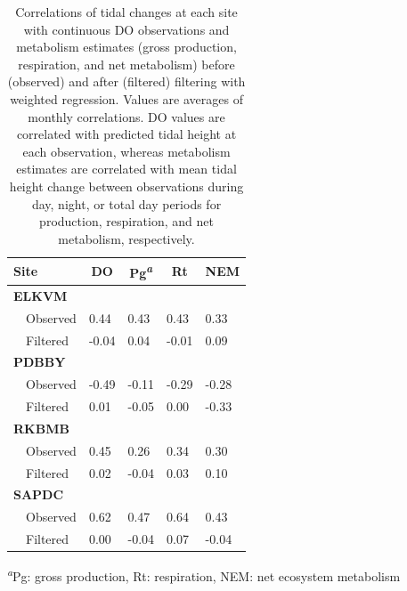 \documentclass[letterpaper,12pt,oneside]{article}\usepackage[]{graphicx}\usepackage[]{color}
\begin{document}
\begin{table}[!tbp]
\caption{Correlations of tidal changes at each site with continuous \ac{DO} observations and metabolism estimates (gross production, respiration, and net metabolism) before (observed) and after (filtered) filtering with weighted regression.  Values are averages of monthly correlations.  \ac{DO} values are correlated with predicted tidal height at each observation, whereas metabolism estimates are correlated with mean tidal height change between observations during day, night, or total day periods for production, respiration, and net metabolism, respectively.\label{tab:cor_res}} 
\begin{center}
\begin{tabular}{lllll}
\hline\hline
\multicolumn{1}{l}{Site}&\multicolumn{1}{c}{DO}&\multicolumn{1}{c}{Pg\textsuperscript{\textit{a}}}&\multicolumn{1}{c}{Rt}&\multicolumn{1}{c}{NEM}\tabularnewline
\hline
{\bfseries ELKVM}&&&&\tabularnewline
~~Observed& 0.44& 0.43& 0.43& 0.33\tabularnewline
~~Filtered&-0.04& 0.04&-0.01& 0.09\tabularnewline
\hline
{\bfseries PDBBY}&&&&\tabularnewline
~~Observed&-0.49&-0.11&-0.29&-0.28\tabularnewline
~~Filtered& 0.01&-0.05& 0.00&-0.33\tabularnewline
\hline
{\bfseries RKBMB}&&&&\tabularnewline
~~Observed& 0.45& 0.26& 0.34& 0.30\tabularnewline
~~Filtered& 0.02&-0.04& 0.03& 0.10\tabularnewline
\hline
{\bfseries SAPDC}&&&&\tabularnewline
~~Observed& 0.62& 0.47& 0.64& 0.43\tabularnewline
~~Filtered& 0.00&-0.04& 0.07&-0.04\tabularnewline
\hline
\end{tabular}\end{center}

\textsuperscript{\textit{a}}Pg: gross production, Rt: respiration, NEM: net ecosystem metabolism\end{table}
\end{document}
